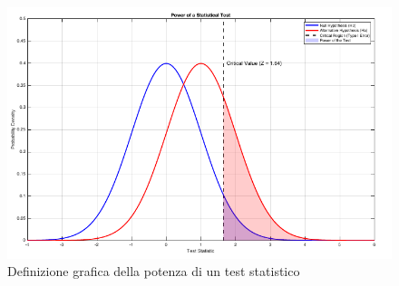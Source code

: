 \begin{figure}[h]
\centering
\includegraphics[width=.7\textwidth]{img/chapter-4/power-value.png}
\caption{Definizione grafica della potenza di un test statistico}\label{img:power-value}
\end{figure}


